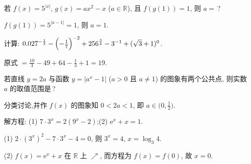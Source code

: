   \begin{exercise}
    若 $f(x)=5^{|x|}$, $g(x)=ax^2 -x$ ($a\in\mathbb{R}$),
    且 $f(g(1))=1$, 则 $a=$\,?
  \end{exercise}

  \beginsolution
    $f(g(1))=5^{|a-1|}=1$, 则 $a=1$.
  \endsolution
  
  \begin{exercise}
    计算: $0.027^{-\frac13}- \Bigl(-\frac17\Bigr)^{-2}
      + 256^{\frac34}- 3^{-1}+ (\sqrt3+1)^0$.
  \end{exercise}

  \beginsolution
    原式 $=\frac{10}3-49+64-\frac13+1=19$.
  \endsolution
  
  \begin{exercise}
    若直线 $y=2a$ 与函数 $y=|a^x -1|$ ($a>0$ 且 $a\neq1$) 
    的图象有两个公共点, 则实数 $a$ 的取值范围是\,?
  \end{exercise}

  \beginsolution
    分类讨论,并作 $f(x)$ 的图象知 $0<2a<1$, 即 $a\in\Big(0,\frac12\Big)$.
  \endsolution
  
  \begin{exercise}
    解方程: (1) $7\cdot 3^x=2(9^x-2)$;\quad (2) $\mathrm{e}^x+x=1$.
  \end{exercise}
  
  \beginsolution
    (1) $2\cdot(3^x)^2-7\cdot 3^x-4=0$, 则 $3^x=4$, $x=\log_3 4$.
    
    (2) $f(x)=\mathrm{e}^x+x$ 在 $\mathbb{R}$ 上 $\nearrow$, 
    而方程为 $f(x)=f(0)$, 故 $x=0$.
  \endsolution
  
